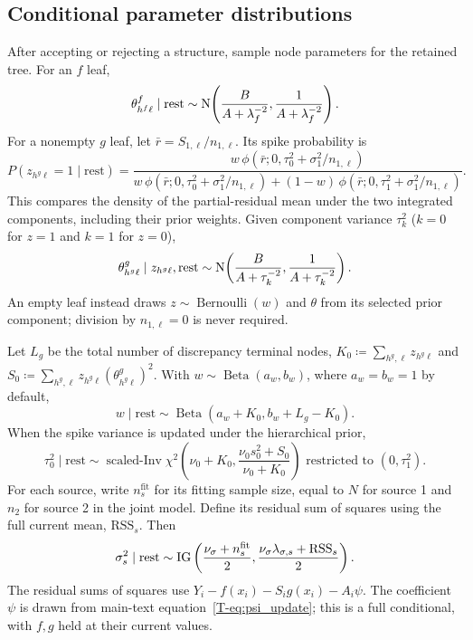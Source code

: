 \subsection{Conditional parameter distributions}\label{sec:A.5}
After accepting or rejecting a structure, sample node parameters for the retained tree. For an $f$ leaf,
\begin{equation}
\theta^f_{h^f\ell}\mid\text{rest}\sim
\mathrm{N}\!\left(\frac{B}{A+\lambda_f^{-2}},\frac{1}{A+\lambda_f^{-2}}\right).
\end{equation}
For a nonempty $g$ leaf, let $\bar r=S_{1,\ell}/n_{1,\ell}$. Its spike probability is
\begin{equation}\label{eq:spikeposterior}
P(z_{h^g\ell}=1\mid\text{rest})=
\frac{w\,\phi(\bar r;0,\tau_0^2+\sigma_1^2/n_{1,\ell})}
{w\,\phi(\bar r;0,\tau_0^2+\sigma_1^2/n_{1,\ell})+(1-w)\,\phi(\bar r;0,\tau_1^2+\sigma_1^2/n_{1,\ell})}.
\end{equation}
This compares the density of the partial-residual mean under the two integrated components, including their prior weights. Given component variance $\tau_k^2$ ($k=0$ for $z=1$ and $k=1$ for $z=0$),
\begin{equation}
\theta^g_{h^g\ell}\mid z_{h^g\ell},\text{rest}\sim
\mathrm{N}\!\left(\frac{B}{A+\tau_k^{-2}},\frac{1}{A+\tau_k^{-2}}\right).
\end{equation}
An empty leaf instead draws $z\sim\operatorname{Bernoulli}(w)$ and $\theta$ from its selected prior component; division by $n_{1,\ell}=0$ is never required.

Let $L_g$ be the total number of discrepancy terminal nodes, $K_0\coloneqq \sum_{h^g,\ell}z_{h^g\ell}$ and $S_0\coloneqq \sum_{h^g,\ell}z_{h^g\ell}(\theta^g_{h^g\ell})^2$. With $w\sim\operatorname{Beta}(a_w,b_w)$, where $a_w=b_w=1$ by default,
\begin{equation}
w\mid\text{rest}\sim\operatorname{Beta}(a_w+K_0,b_w+L_g-K_0).
\end{equation}
When the spike variance is updated under the hierarchical prior,
\begin{equation}
\tau_0^2\mid\text{rest}\sim
\operatorname{scaled\text{-}Inv}\chi^2\!\left(
\nu_0+K_0,\frac{\nu_0s_0^2+S_0}{\nu_0+K_0}\right)
\text{ restricted to }(0,\tau_1^2).
\end{equation}
For each source, write $n_s^{\mathrm{fit}}$ for its fitting sample size, equal to $N$ for source 1 and $n_2$ for source 2 in the joint model. Define its residual sum of squares using the full current mean, $\mathrm{RSS}_{s}$. Then
\begin{equation}
\sigma_{s}^2\mid\text{rest}\sim
\operatorname{IG}\left(\frac{\nu_\sigma+n_s^{\mathrm{fit}}}{2},\frac{\nu_\sigma\lambda_{\sigma,s}+\mathrm{RSS}_{s}}{2}\right).
\end{equation}
The residual sums of squares use $Y_i-f(x_i)-S_i g(x_i)-A_i\psi$. The coefficient $\psi$ is drawn from main-text equation~\eqref{T-eq:psi_update}; this is a full conditional, with $f,g$ held at their current values.

